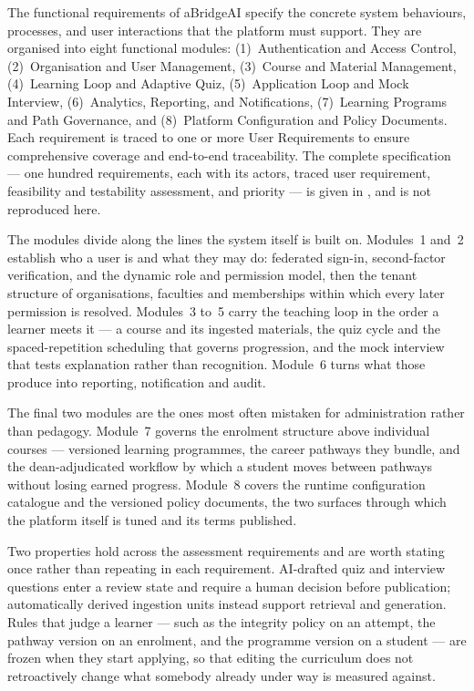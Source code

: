 The functional requirements of aBridgeAI specify the concrete system behaviours, processes, and user interactions that the platform must support. They are organised into eight functional modules: (1)~Authentication and Access Control, (2)~Organisation and User Management, (3)~Course and Material Management, (4)~Learning Loop and Adaptive Quiz, (5)~Application Loop and Mock Interview, (6)~Analytics, Reporting, and Notifications, (7)~Learning Programs and Path Governance, and (8)~Platform Configuration and Policy Documents. Each requirement is traced to one or more User Requirements to ensure comprehensive coverage and end-to-end traceability. The complete specification --- one hundred requirements, each with its actors, traced user requirement, feasibility and testability assessment, and priority --- is given in , and is not reproduced here.

The modules divide along the lines the system itself is built on. Modules~1 and~2 establish who a user is and what they may do: federated sign-in, second-factor verification, and the dynamic role and permission model, then the tenant structure of organisations, faculties and memberships within which every later permission is resolved. Modules~3 to~5 carry the teaching loop in the order a learner meets it --- a course and its ingested materials, the quiz cycle and the spaced-repetition scheduling that governs progression, and the mock interview that tests explanation rather than recognition. Module~6 turns what those produce into reporting, notification and audit.

The final two modules are the ones most often mistaken for administration rather than pedagogy. Module~7 governs the enrolment structure above individual courses --- versioned learning programmes, the career pathways they bundle, and the dean-adjudicated workflow by which a student moves between pathways without losing earned progress. Module~8 covers the runtime configuration catalogue and the versioned policy documents, the two surfaces through which the platform itself is tuned and its terms published.

Two properties hold across the assessment requirements and are worth stating once rather than repeating in each requirement. AI-drafted quiz and interview questions enter a review state and require a human decision before publication; automatically derived ingestion units instead support retrieval and generation. Rules that judge a learner --- such as the integrity policy on an attempt, the pathway version on an enrolment, and the programme version on a student --- are frozen when they start applying, so that editing the curriculum does not retroactively change what somebody already under way is measured against.



